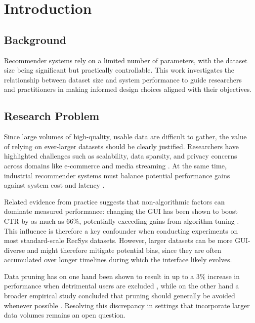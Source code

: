 \documentclass[sigconf,nonacm]{acmart}
\begin{document}

\maketitle

\section{Introduction}
\subsection{Background}
Recommender systems rely on a limited number of parameters, with the dataset size being significant but practically controllable. This work investigates the relationship between dataset size and system performance to guide researchers and practitioners in making informed design choices aligned with their objectives.

\subsection{Research Problem}
Since large volumes of high-quality, usable data are difficult to gather, the value of relying on ever-larger datasets should be clearly justified. Researchers have highlighted challenges such as scalability, data sparsity, and privacy concerns across domains like e-commerce and media streaming \cite{raza2026}. At the same time, industrial recommender systems must balance potential performance gains against system cost and latency \cite{zou2025}.

Related evidence from practice suggests that non-algorithmic factors can dominate measured performance: changing the GUI has been shown to boost CTR by as much as $66\%$, potentially exceeding gains from algorithm tuning \cite{beel2021}. This influence is therefore a key confounder when conducting experiments on most standard-scale RecSys datasets. However, larger datasets can be more GUI-diverse and might therefore mitigate potential bias, since they are often accumulated over longer timelines during which the interface likely evolves.

Data pruning has on one hand been shown to result in up to a $3\%$ increase in performance when detrimental users are excluded \cite{meister2024}, while on the other hand a broader empirical study concluded that pruning should generally be avoided whenever possible \cite{beel2019}. Resolving this discrepancy in settings that incorporate larger data volumes remains an open question.
\end{document}
